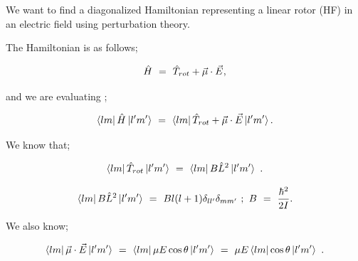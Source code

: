 \documentclass{article}
\newcounter{subsubsubsection}[subsubsection]
\begin{document}


We want to find a diagonalized Hamiltonian representing a linear rotor (HF) in an electric field using perturbation theory. 

The Hamiltonian is as follows;

\begin{equation} \label{eq:256}
\hat{H} \hspace{0.125cm} = \hspace{0.125cm} \hat{T}_{rot} + \vec\mu\cdot\vec{E} \hspace{0.0125cm} , 
\end{equation}

and we are evaluating ; 

\begin{equation} \label{eq:257}
\bra{l m}\hat{H}\ket{l' m'} \hspace{0.125cm} = \hspace{0.125cm} \bra{l m} \hat{T}_{rot} + \vec\mu\cdot\vec{E}\ket{l' m'} . 
\end{equation}

We know that;

\begin{equation} \label{eq:258}
\bra{l m}\hat{T}_{rot}\ket{l' m'} \hspace{0.125cm} = \hspace{0.125cm} \bra{l m}B\hat{L}^{2}\ket{l' m'} \hspace{0.125cm} .
\end{equation}

\begin{equation} \label{eq:259}
\bra{l m}B\hat{L}^{2}\ket{l' m'} \hspace{0.125cm} = \hspace{0.125cm} Bl(l+1) \delta_{l l'}\delta_{m m'} \hspace{0.125cm} ; \hspace{0.125cm} B \hspace{0.125cm} = \hspace{0.125cm} \frac{\hbar^{2}}{2I} .
\end{equation}

We also know;

\begin{equation} \label{eq:260}
\bra{l m}\vec{\mu}\cdot\vec{E}\ket{l' m'} \hspace{0.125cm} = \hspace{0.125cm} \bra{l m}\mu E\cos\theta\ket{l' m'} \hspace{0.125cm} = \hspace{0.125cm} \mu E\bra{l m}\cos\theta\ket{l' m'} \hspace{0.125cm}.
\end{equation}
\end{document}
